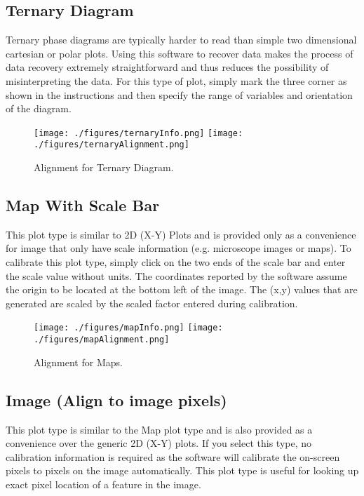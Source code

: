 \documentclass[letterpaper, 10pt]{article}
\begin{document}
\subsection{Ternary Diagram}
Ternary phase diagrams are typically harder to read than simple two dimensional cartesian or polar plots. Using this software to recover data makes the process of data recovery extremely straightforward and thus reduces the possibility of misinterpreting the data. For this type of plot, simply mark the three corner as shown in the instructions and then specify the range of variables and orientation of the diagram.

\begin{figure}
\begin{center}
\texttt{[image: ./figures/ternaryInfo.png]}
\texttt{[image: ./figures/ternaryAlignment.png]}
\caption{Alignment for Ternary Diagram.}
\label{fig:ternaryAlignment}
\end{center}
\end{figure}

\subsection{Map With Scale Bar}
This plot type is similar to 2D (X-Y) Plots and is provided only as a convenience for image that only have scale information (e.g. microscope images or maps). To calibrate this plot type, simply click on the two ends of the scale bar and enter the scale value without units. The coordinates reported by the software assume the origin to be located at the bottom left of the image. The (x,y) values that are generated are scaled by the scaled factor entered during calibration.

\begin{figure}
\begin{center}
\texttt{[image: ./figures/mapInfo.png]}
\texttt{[image: ./figures/mapAlignment.png]}
\caption{Alignment for Maps.}
\label{fig:mapAlignment}
\end{center}
\end{figure}

\subsection{Image (Align to image pixels)}
This plot type is similar to the Map plot type and is also provided as a convenience over the generic 2D (X-Y) plots. If you select this type, no calibration information is required as the software will calibrate the on-screen pixels to pixels on the image automatically. This plot type is useful for looking up exact pixel location of a feature in the image.
\end{document}
